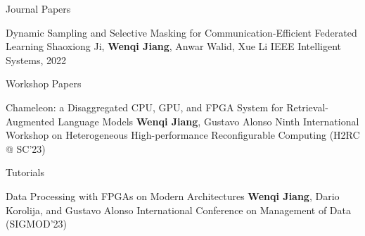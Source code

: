 \begin{rSection}{Journal Papers}
\begin{enumerate}[label={[\arabic*]}]

\item 
\begin{Pub}{Dynamic Sampling and Selective Masking for Communication-Efficient Federated Learning}
{Shaoxiong Ji, \textbf{Wenqi Jiang}, Anwar Walid, Xue Li}
{IEEE Intelligent Systems, 2022 }
\end{Pub}\end{enumerate}
\end{rSection}



\begin{rSection}{Workshop Papers}
\begin{enumerate}[label={[\arabic*]}]

\item 
\begin{Pub}{Chameleon: a Disaggregated CPU, GPU, and FPGA System for Retrieval-Augmented Language Models}
{\textbf{Wenqi Jiang}, Gustavo Alonso}
{Ninth International Workshop on Heterogeneous High-performance Reconfigurable Computing (H2RC @ SC'23)}
\end{Pub}\end{enumerate}
\end{rSection}



\begin{rSection}{Tutorials}

\begin{enumerate}[label={[\arabic*]}]

\item 
\begin{Pub}{Data Processing with FPGAs on Modern Architectures}
{\textbf{Wenqi Jiang}, Dario Korolija, and Gustavo Alonso}
{International Conference on Management of Data (SIGMOD'23)}
\end{Pub}\end{enumerate}
\end{rSection}

